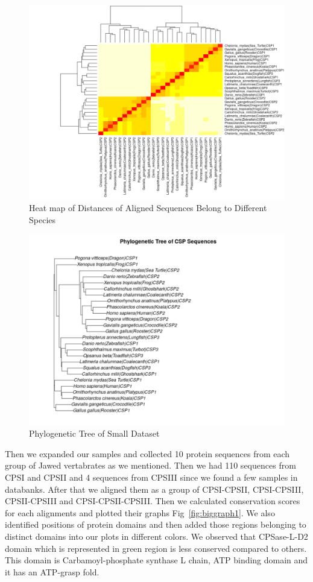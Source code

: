 \documentclass[a4paper]{article}
\begin{document}
\begin{figure}[H]
\begin{center}
\includegraphics[width=.8\textwidth]{heatmap.png}
\end{center}
\caption{Heat map of Distances of Aligned Sequences Belong to Different Species}
\label{fig:heatmap}
\end{figure}

\newpage

\begin{figure}[H]
\begin{center}
\includegraphics[width=\textwidth]{tree.png}
\end{center}
\caption{Phylogenetic Tree of Small Dataset}
\label{fig:tree}
\end{figure}
Then we expanded our samples and collected 10 protein sequences from each group of Jawed vertabrates as we mentioned. Then we had 110 sequences from CPSI and CPSII and 4 sequences from CPSIII since we found a few samples in databanks. After that we aligned them as a group of CPSI-CPSII, CPSI-CPSIII, CPSII-CPSIII and CPSI-CPSII-CPSIII. Then we calculated conservation scores for each alignments and plotted their graphs Fig~\ref{fig:biggraph1}. We also identified positions of protein domains and then added those regions belonging to distinct domains into our plots in different colors. We observed that CPSase-L-D2 domain which is represented in green region is less conserved compared to others. This domain is Carbamoyl-phosphate synthase L chain, ATP binding domain and it has an ATP-grasp fold.  
\end{document}

